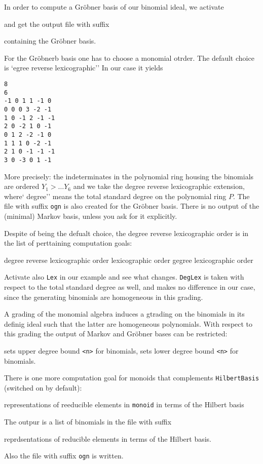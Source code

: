 In order to compute a Gröbner basis of our binomial ideal, we activate
\begin{itemize}
	\itemtt[GroebnerBasis]
\end{itemize}
and get the output file with suffix
\begin{itemize}
	\itemtt[grb] containing the Gröbner basis.
\end{itemize}
For the Gröbnerb basis one has to choose a monomial otrder. The default choice is `egree reverse lexicographic'' In our case it yields
\begin{Verbatim}
8
6
-1 0 1 1 -1 0 
0 0 0 3 -2 -1 
1 0 -1 2 -1 -1 
2 0 -2 1 0 -1 
0 1 2 -2 -1 0 
1 1 1 0 -2 -1 
2 1 0 -1 -1 -1 
3 0 -3 0 1 -1 
\end{Verbatim}
More precisely: the indeterminates in the polynomial ring housing the binomials are ordered $Y_1 > \dots Y_6$ and we take the degree reverse lexicographic extension, where`  degree'' means the total standard degree on the polynomial ring $P$. The file with suffix \verb|ogn| is also created for the Gröbner basis. There is no output of the (minimal) Markov basis, unless you ask for it explicitly. 

Despite of being the defualt choice, the degree reverse lexicographic order is in the list of perttaining computation goals:
\begin{itemize}
	\itemtt[RevLex] degree reverse lexicographic order
	\itemtt[Lex] lexicographic order
	\itemtt[DegLex] gegree lexicographic order 
\end{itemize}
Activate also \verb|Lex| in our example and see what changes. \verb|DegLex| is taken with respect to the total standard degree as well, and makes no difference in our case, since the generating binomials are homogeneous in this grading.

A grading of the monomial algebra induces a gtrading on the binomials in its definig ideal such that the latter are homogeneous polynomials. With respect to this grading  the output of Markov and Gröbner bases can be restricted:
\begin{itemize}
	 sets upper degree bound \verb|<n>| for binomials,
	 sets lower degree bound  \verb|<n>| for binomials. 
\end{itemize}

There is one more computation goal for monoids that complements \verb|HilbertBasis| (switched on by default):
\begin{itemize}
	\itemtt[Representations] representations of reeducible elements in \verb|monoid| in terms of the Hilbert basis
\end{itemize}
The outpur is a list of binomials in the file with suffix
\begin{itemize}
	\itemtt[rep] reprdsentations of reducible elements in terms of the Hilbert basis.
\end{itemize}
Also the file with suffix \verb|ogn| is written.

